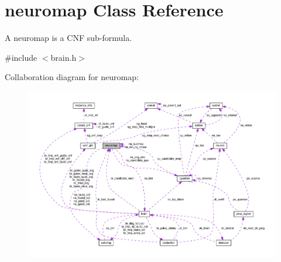 \hypertarget{classneuromap}{\section{neuromap Class Reference}
\label{classneuromap}
}


A neuromap is a C\+N\+F sub-\/formula.  




{\ttfamily \#include $<$brain.\+h$>$}



Collaboration diagram for neuromap\+:\nopagebreak
\begin{figure}[H]
\begin{center}
\leavevmode
\includegraphics[width=350pt]{d2/d85/classneuromap__coll__graph}
\end{center}
\end{figure}
